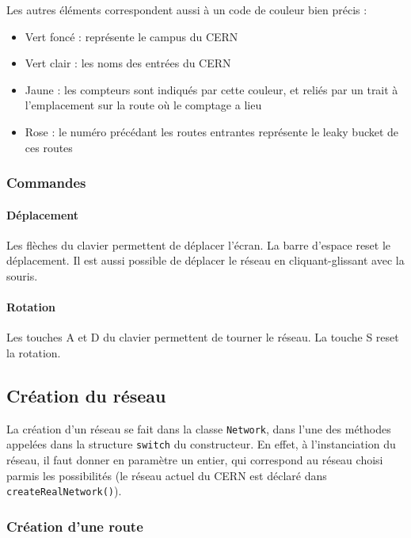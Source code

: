 \documentclass[a4paper,11pt, titlepage]{extarticle}
\begin{document}
Les autres éléments correspondent aussi à un code de couleur bien précis :

\begin{itemize}
\item Vert foncé : représente le campus du CERN
\item Vert clair : les noms des entrées du CERN
\item Jaune : les compteurs sont indiqués par cette couleur, et reliés par un trait à l'emplacement sur la route où le comptage a lieu
\item Rose : le numéro précédant les routes entrantes représente le leaky bucket de ces routes
\end{itemize}

\subsubsection{Commandes}

\paragraph{Déplacement}

Les flèches du clavier permettent de déplacer l'écran. La barre d'espace reset le déplacement. Il est aussi possible de déplacer le réseau en cliquant-glissant avec la souris.

\paragraph{Rotation}

Les touches A et D du clavier permettent de tourner le réseau. La touche S reset la rotation.

\newpage

\subsection{Création du réseau}

La création d'un réseau se fait dans la classe \texttt{Network}, dans l'une des méthodes appelées dans la structure \texttt{switch} du constructeur. En effet, à l'instanciation du réseau, il faut donner en paramètre un entier, qui correspond au réseau choisi parmis les possibilités (le réseau actuel du CERN est déclaré dans \texttt{createRealNetwork()}).

\subsubsection{Création d'une route}
\end{document}
